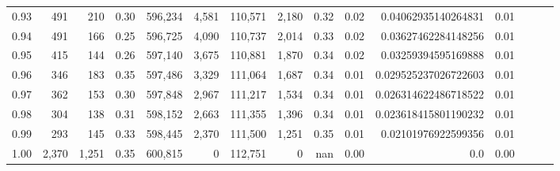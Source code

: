\begin{tabular}{rrrrrrrrrrrrrrr}
0.93 &     491 &    210 &  0.30 &  596,234 &    4,581 &  110,571 &    2,180 &  0.32 &  0.02 &   0.04062935140264831 &      0.01 \\
0.94 &     491 &    166 &  0.25 &  596,725 &    4,090 &  110,737 &    2,014 &  0.33 &  0.02 &   0.03627462284148256 &      0.01 \\
0.95 &     415 &    144 &  0.26 &  597,140 &    3,675 &  110,881 &    1,870 &  0.34 &  0.02 &   0.03259394595169888 &      0.01 \\
0.96 &     346 &    183 &  0.35 &  597,486 &    3,329 &  111,064 &    1,687 &  0.34 &  0.01 &  0.029525237026722603 &      0.01 \\
0.97 &     362 &    153 &  0.30 &  597,848 &    2,967 &  111,217 &    1,534 &  0.34 &  0.01 &  0.026314622486718522 &      0.01 \\
0.98 &     304 &    138 &  0.31 &  598,152 &    2,663 &  111,355 &    1,396 &  0.34 &  0.01 &  0.023618415801190232 &      0.01 \\
0.99 &     293 &    145 &  0.33 &  598,445 &    2,370 &  111,500 &    1,251 &  0.35 &  0.01 &   0.02101976922599356 &      0.01 \\
1.00 &   2,370 &  1,251 &  0.35 &  600,815 &        0 &  112,751 &        0 &   nan &  0.00 &                   0.0 &      0.00 \\
\bottomrule
\end{tabular}
